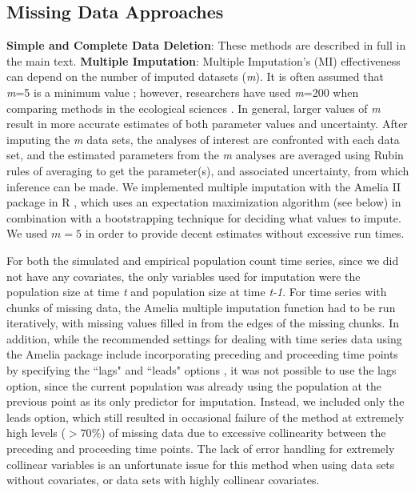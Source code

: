 \subsection{Missing Data Approaches} 
\textbf{Simple and Complete Data Deletion}: These methods are described in full in the main text.
\textbf{Multiple Imputation}: 
Multiple Imputation’s (MI) effectiveness can depend on the number of imputed datasets (\textit{m}). It is often assumed that \textit{m}=5 is a minimum value \citep{honaker_what_2010}; however, researchers have used \textit{m}=200 when comparing methods in the ecological sciences \citep{onkelinx_working_2017}. In general, larger values of \textit{m} result in more accurate estimates of both parameter values and uncertainty. %
After imputing the \textit{m} data sets, the analyses of interest are confronted with each data set, and the estimated parameters from the \textit{m} analyses are averaged using Rubin rules of averaging to get the parameter(s), and associated uncertainty, from which inference can be made. We implemented multiple imputation with the Amelia II package in R \citep{honaker2011}, which uses an expectation maximization algorithm (see below) in combination with a bootstrapping technique for deciding what values to impute. We used $m=5$ in order to provide decent estimates without excessive run times.

For both the simulated and empirical population count time series, since we did not have any covariates, the only variables used for imputation were the population size at time \textit{t} and population size at time \textit{t-1}. For time series with chunks of missing data, the Amelia multiple imputation function had to be run iteratively, with missing values filled in from the edges of the missing chunks. In addition, while the recommended settings for dealing with time series data using the Amelia package include incorporating preceding and proceeding time points by specifying the ``lags" and ``leads" options \citep{honaker2011}, it was not possible to use the lags option, since the current population was already using the population at the previous point as its only predictor for imputation. Instead, we included only the leads option, which still resulted in occasional failure of the method at extremely high levels ($>70\%$) of missing data due to excessive collinearity between the preceding and proceeding time points. The lack of error handling for extremely collinear variables is an unfortunate issue for this method when using data sets without covariates, or data sets with highly collinear covariates.  

